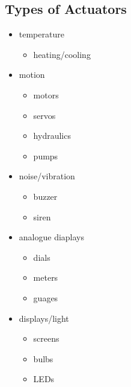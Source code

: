 \documentclass[11pt]{article}
\begin{document}
\subsection{Types of Actuators}
\label{sec:org9ece385}
\begin{itemize}
\item temperature
\begin{itemize}
\item heating/cooling
\end{itemize}
\item motion
\begin{itemize}
\item motors
\item servos
\item hydraulics
\item pumps
\end{itemize}
\item noise/vibration
\begin{itemize}
\item buzzer
\item siren
\end{itemize}
\item analogue diaplays
\begin{itemize}
\item dials
\item meters
\item guages
\end{itemize}
\item displays/light
\begin{itemize}
\item screens
\item bulbs
\item LEDs
\end{itemize}
\end{itemize}
\end{document}
